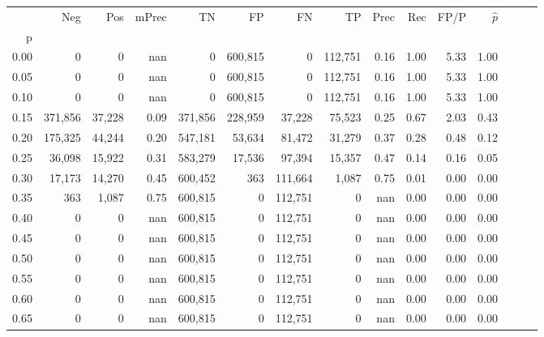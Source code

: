\begin{tabular}{rrrrrrrrrrrrrrr}
\toprule
{} &      Neg &     Pos & mPrec &       TN &       FP &       FN &       TP &  Prec &   Rec &  FP/P & $\hat{p}$ \\
p    &          &         &       &          &          &          &          &       &       &       &           \\
\midrule
0.00 &        0 &       0 &   nan &        0 &  600,815 &        0 &  112,751 &  0.16 &  1.00 &  5.33 &      1.00 \\
0.05 &        0 &       0 &   nan &        0 &  600,815 &        0 &  112,751 &  0.16 &  1.00 &  5.33 &      1.00 \\
0.10 &        0 &       0 &   nan &        0 &  600,815 &        0 &  112,751 &  0.16 &  1.00 &  5.33 &      1.00 \\
0.15 &  371,856 &  37,228 &  0.09 &  371,856 &  228,959 &   37,228 &   75,523 &  0.25 &  0.67 &  2.03 &      0.43 \\
0.20 &  175,325 &  44,244 &  0.20 &  547,181 &   53,634 &   81,472 &   31,279 &  0.37 &  0.28 &  0.48 &      0.12 \\
0.25 &   36,098 &  15,922 &  0.31 &  583,279 &   17,536 &   97,394 &   15,357 &  0.47 &  0.14 &  0.16 &      0.05 \\
0.30 &   17,173 &  14,270 &  0.45 &  600,452 &      363 &  111,664 &    1,087 &  0.75 &  0.01 &  0.00 &      0.00 \\
0.35 &      363 &   1,087 &  0.75 &  600,815 &        0 &  112,751 &        0 &   nan &  0.00 &  0.00 &      0.00 \\
0.40 &        0 &       0 &   nan &  600,815 &        0 &  112,751 &        0 &   nan &  0.00 &  0.00 &      0.00 \\
0.45 &        0 &       0 &   nan &  600,815 &        0 &  112,751 &        0 &   nan &  0.00 &  0.00 &      0.00 \\
0.50 &        0 &       0 &   nan &  600,815 &        0 &  112,751 &        0 &   nan &  0.00 &  0.00 &      0.00 \\
0.55 &        0 &       0 &   nan &  600,815 &        0 &  112,751 &        0 &   nan &  0.00 &  0.00 &      0.00 \\
0.60 &        0 &       0 &   nan &  600,815 &        0 &  112,751 &        0 &   nan &  0.00 &  0.00 &      0.00 \\
0.65 &        0 &       0 &   nan &  600,815 &        0 &  112,751 &        0 &   nan &  0.00 &  0.00 &      0.00 \\

\end{tabular}
